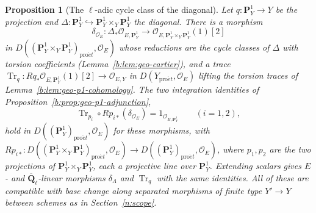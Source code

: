 \documentclass[11pt,a4paper]{article}
\numberwithin{equation}{section}
\newtheorem{proposition}[theorem]{Proposition}
\theoremstyle{definition}
\theoremstyle{remark}
\newcommand{\Qbar}{\overline{\mathbf Q}_\ell}
\newcommand{\proet}{\mathrm{pro}\acute{e}t}
\begin{document}
\begin{proposition}[The $\ell$-adic cycle class of the diagonal]
\label{b:prop:diagonal-tower}
Let $q:\mathbf P^1_Y\to Y$ be the projection and
$\Delta:\mathbf P^1_Y\hookrightarrow\mathbf P^1_Y\times_Y\mathbf P^1_Y$
the diagonal. There is a morphism
\[
 \delta_{\mathcal O_E}:\Delta_*\mathcal O_{E,\mathbf P^1_Y}
              \longrightarrow
              \mathcal O_{E,\mathbf P^1_Y\times_Y\mathbf P^1_Y}(1)[2]
\]
in $D((\mathbf P^1_Y\times_Y\mathbf P^1_Y)_{\proet},\mathcal O_E)$ whose
reductions are the cycle classes of $\Delta$ with torsion coefficients
(Lemma~\ref{b:lem:geo-cartier}), and a trace
$\operatorname{Tr}_q:Rq_*\mathcal O_{E,\mathbf P^1_Y}(1)[2]\to\mathcal O_{E,Y}$
in $D(Y_{\proet},\mathcal O_E)$ lifting the torsion traces of Lemma~\ref{b:lem:geo-p1-cohomology}. The two
integration identities of Proposition~\ref{b:prop:geo-p1-adjunction},
\[
 \operatorname{Tr}_{p_i}\circ Rp_{i*}(\delta_{\mathcal O_E})
   =1_{\mathcal O_{E,\mathbf P^1_Y}}\qquad(i=1,2),
\]
hold in $D((\mathbf P^1_Y)_{\proet},\mathcal O_E)$ for these morphisms,
with $Rp_{i*}\colon D((\mathbf P^1_Y\times_Y\mathbf P^1_Y)_{\proet},\mathcal O_E)\to D((\mathbf P^1_Y)_{\proet},\mathcal O_E)$, where $p_1,p_2$ are the two projections of
$\mathbf P^1_Y\times_Y\mathbf P^1_Y$, each a projective line over
$\mathbf P^1_Y$. Extending scalars gives $E$- and $\Qbar$-linear
morphisms $\delta_\Lambda$ and $\operatorname{Tr}_q$ with the same
identities. All of these are compatible with base change along
separated morphisms of finite type $Y'\to Y$ between schemes as in
Section~\ref{n:scope}.
\end{proposition}
\end{document}
